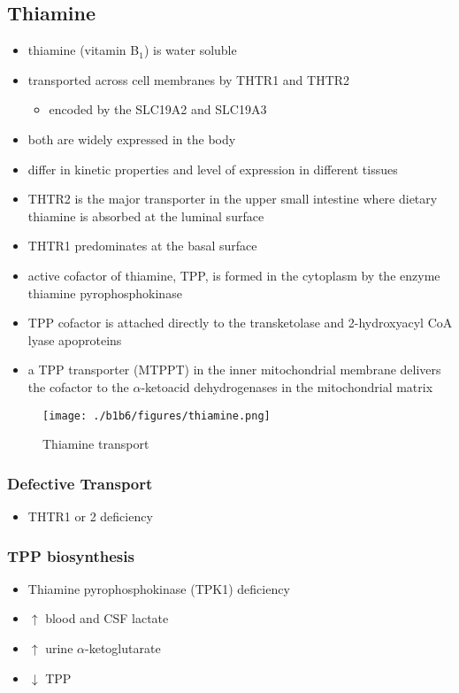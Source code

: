 \documentclass{scrartcl}
\begin{document}
\subsection{Thiamine}
\label{sec:org86e50b8}
\begin{itemize}
\item thiamine (vitamin B\(_{\text{1}}\)) is water soluble
\item transported across cell membranes by THTR1 and THTR2
\begin{itemize}
\item encoded by the SLC19A2 and SLC19A3
\end{itemize}
\item both are widely expressed in the body
\item differ in kinetic properties and level of expression in different tissues
\item THTR2 is the major transporter in the upper small intestine where
dietary thiamine is absorbed at the luminal surface
\item THTR1 predominates at the basal surface
\item active cofactor of thiamine, TPP, is formed in the cytoplasm by the
enzyme thiamine pyrophosphokinase
\item TPP cofactor is attached directly to the transketolase and 2-hydroxyacyl CoA lyase apoproteins
\item a TPP transporter (MTPPT) in the inner mitochondrial membrane
delivers the cofactor to the \(\alpha\)-ketoacid dehydrogenases in the
mitochondrial matrix
\end{itemize}

\begin{figure}[htbp]
\centering
\texttt{[image: ./b1b6/figures/thiamine.png]}
\caption{\label{fig:org02316e8}
Thiamine transport}
\end{figure}

\subsubsection{Defective Transport}
\label{sec:orga0079cf}
\begin{itemize}
\item THTR1 or 2 deficiency
\end{itemize}
\subsubsection{TPP biosynthesis}
\label{sec:org373d39a}
\begin{itemize}
\item Thiamine pyrophosphokinase (TPK1) deficiency
\item \(\uparrow\) blood and CSF lactate
\item \(\uparrow\) urine \(\alpha\)-ketoglutarate
\item \(\downarrow\) TPP
\end{itemize}
\end{document}
